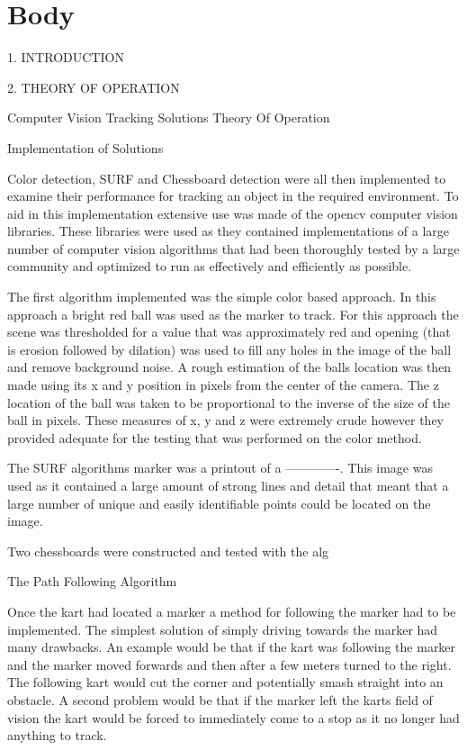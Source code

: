 \section{Body}

1.	INTRODUCTION



2.	THEORY OF OPERATION

Computer Vision Tracking Solutions Theory Of Operation



Implementation of Solutions

Color detection, SURF and Chessboard detection were all then implemented to examine their performance for tracking an object in the required environment. To aid in this implementation extensive use was made of the opencv computer vision libraries. These libraries were used as they contained implementations of a large number of computer vision algorithms that had been thoroughly tested by a large community and optimized to run as effectively and efficiently as possible.

The first algorithm implemented was the simple color based approach. In this approach a bright red ball was used as the marker to track. For this approach the scene was thresholded for a value that was approximately red and opening (that is erosion followed by dilation) was used to fill any holes in the image of the ball and remove background noise. A rough estimation of the balls location was then made using its x and y position in pixels from the center of the camera. The z location of the ball was taken to be proportional to the inverse of the size of the ball in pixels. These measures of x, y and z were extremely crude however they provided adequate for the testing that was performed on the color method.

The SURF algorithms marker was a printout of a -------------. This image was used as it contained a large amount of strong lines and detail that meant that a large number of unique and easily identifiable points could be located on the image.

Two chessboards were constructed and tested with the alg

The Path Following Algorithm

Once the kart had located a marker a method for following the marker had to be implemented. The simplest solution of simply driving towards the marker had many drawbacks. An example would be that if the kart was following the marker and the marker moved forwards and then after a few meters turned to the right. The following kart would cut the corner and potentially smash straight into an obstacle. A second problem would be that if the marker left the karts field of vision the kart would be forced to immediately come to a stop as it no longer had anything to track.

